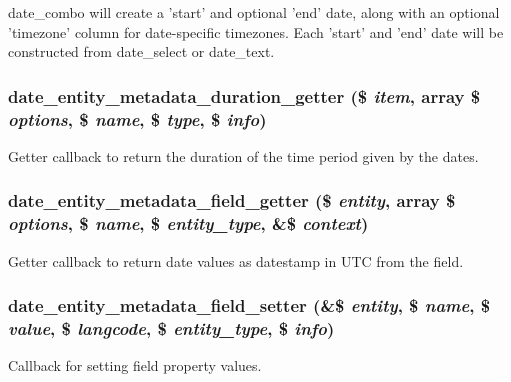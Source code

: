 date\_\-combo will create a 'start' and optional 'end' date, along with an optional 'timezone' column for date-\/specific timezones. Each 'start' and 'end' date will be constructed from date\_\-select or date\_\-text. \hypertarget{date_8module_ac9eff22b4b527da84cfdc74552130fe2}{
\subsubsection[{date\_\-entity\_\-metadata\_\-duration\_\-getter}]{\setlength{\rightskip}{0pt plus 5cm}date\_\-entity\_\-metadata\_\-duration\_\-getter (\$ {\em item}, \/  array \$ {\em options}, \/  \$ {\em name}, \/  \$ {\em type}, \/  \$ {\em info})}}
\label{date_8module_ac9eff22b4b527da84cfdc74552130fe2}
Getter callback to return the duration of the time period given by the dates. \hypertarget{date_8module_a8cceacd7fa3a46c19a8daae0dd3379a7}{
\subsubsection[{date\_\-entity\_\-metadata\_\-field\_\-getter}]{\setlength{\rightskip}{0pt plus 5cm}date\_\-entity\_\-metadata\_\-field\_\-getter (\$ {\em entity}, \/  array \$ {\em options}, \/  \$ {\em name}, \/  \$ {\em entity\_\-type}, \/  \&\$ {\em context})}}
\label{date_8module_a8cceacd7fa3a46c19a8daae0dd3379a7}
Getter callback to return date values as datestamp in UTC from the field. \hypertarget{date_8module_ab72347a0a3b46235078025636bcabc78}{
\subsubsection[{date\_\-entity\_\-metadata\_\-field\_\-setter}]{\setlength{\rightskip}{0pt plus 5cm}date\_\-entity\_\-metadata\_\-field\_\-setter (\&\$ {\em entity}, \/  \$ {\em name}, \/  \$ {\em value}, \/  \$ {\em langcode}, \/  \$ {\em entity\_\-type}, \/  \$ {\em info})}}
\label{date_8module_ab72347a0a3b46235078025636bcabc78}
Callback for setting field property values.

